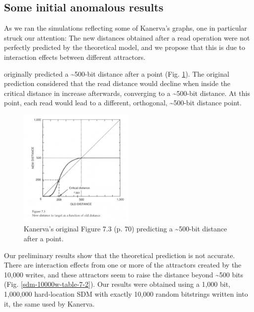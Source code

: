 \subsection{Some initial anomalous results}

As we ran the simulations reflecting some of Kanerva's graphs, one in particular struck our attention:  The new distances obtained after a read operation were not perfectly predicted by the theoretical model, and we propose that this is due to interaction effects between different attractors.

\citet{Kanerva1988} originally predicted a \textasciitilde 500-bit distance after a point (Fig. \ref{kanerva-table-7-2}). The original prediction considered that the read distance would decline when inside the critical distance in increase afterwards, converging to a \textasciitilde 500-bit distance.  At this point, each read would lead to a different, orthogonal, \textasciitilde 500-bit distance point.

\begin{figure}[h]
\centering\includegraphics[width=0.5\textwidth]{images02/kanerva-table-7-2-original.png}
\caption{Kanerva's original Figure 7.3 (p. 70) predicting a \textasciitilde 500-bit distance after a point.
\label{kanerva-table-7-2}}
\end{figure}

Our preliminary results show that the theoretical prediction is not accurate.  There are interaction effects from one or more of the attractors created by the 10,000 writes, and these attractors seem to raise the distance beyond \textasciitilde 500 bits (Fig. \ref{sdm-10000w-table-7-2}). Our results were obtained using a 1,000 bit, 1,000,000 hard-location SDM with exactly 10,000 random bitstrings written into it, the same used by Kanerva.

